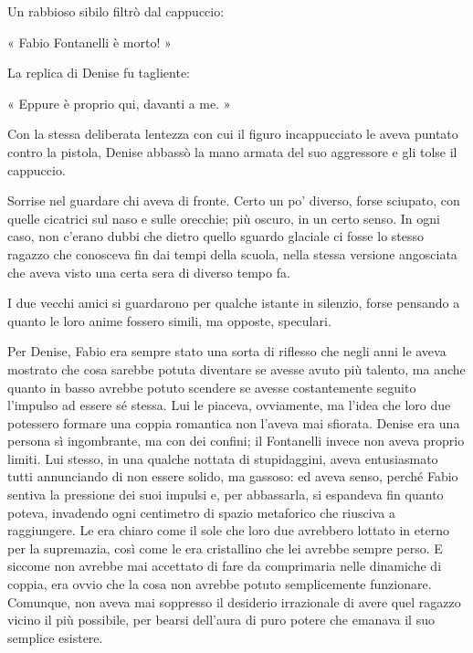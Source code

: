 Un rabbioso sibilo filtrò dal cappuccio:

« Fabio Fontanelli è morto! »

La replica di Denise fu tagliente:

« Eppure è proprio qui, davanti a me. »

Con la stessa deliberata lentezza con cui il figuro incappucciato le aveva puntato contro la pistola, Denise abbassò la mano armata del suo aggressore e gli tolse il cappuccio.

Sorrise nel guardare chi aveva di fronte. Certo un po' diverso, forse sciupato, con quelle cicatrici sul naso e sulle orecchie; più oscuro, in un certo senso. In ogni caso, non c'erano dubbi che dietro quello sguardo glaciale ci fosse lo stesso ragazzo che conosceva fin dai tempi della scuola, nella stessa versione angosciata che aveva visto una certa sera di diverso tempo fa.

I due vecchi amici si guardarono per qualche istante in silenzio, forse pensando  a quanto le loro anime fossero simili, ma opposte, speculari.

Per Denise, Fabio era sempre stato una sorta di riflesso che negli anni le aveva mostrato che cosa sarebbe potuta diventare se avesse avuto più talento, ma anche quanto in basso avrebbe potuto scendere se avesse costantemente seguito l'impulso ad essere sé stessa. Lui le piaceva, ovviamente, ma l'idea che loro due potessero formare una coppia romantica non l'aveva mai sfiorata. Denise era una persona sì ingombrante, ma con dei confini; il Fontanelli invece non aveva proprio limiti. Lui stesso, in una qualche nottata di stupidaggini, aveva entusiasmato tutti annunciando di non essere solido, ma gassoso: ed aveva senso, perché Fabio sentiva la pressione dei suoi impulsi e, per abbassarla, si espandeva fin quanto poteva, invadendo ogni centimetro di spazio metaforico che riusciva a raggiungere. Le era chiaro come il sole che loro due avrebbero lottato in eterno per la supremazia, così come le era cristallino che lei avrebbe sempre perso. E siccome non avrebbe mai accettato di fare da comprimaria nelle dinamiche di coppia, era ovvio che la cosa non avrebbe potuto semplicemente funzionare. Comunque, non aveva mai soppresso il desiderio irrazionale di avere quel ragazzo vicino il più possibile, per bearsi dell'aura di puro potere che emanava il suo semplice esistere.

